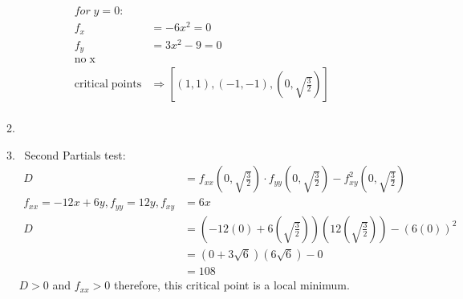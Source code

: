 \documentclass[11pt]{article}
\newcommand\Item[1][]{%
  \ifx\relax#1\relax  \item \else \item[#1] \fi
  \abovedisplayskip=0pt\abovedisplayshortskip=0pt~\vspace*{-\baselineskip}}
\begin{document}
\begin{preview}
\begin{enumerate}
\begin{enumerate}
\begin{align*}
                  for \; y=0:                                                                             \\
                  f_x                              & = -6x^2 = 0                                          \\
                  f_y                              & = 3x^2 - 9 = 0                                       \\
                  \mathrm{no \; x}                                                                        \\
                  \mathrm{critical \; points}      & \Rightarrow [(1,1), (-1,-1), (0,\sqrt{\frac{3}{2}})] \\
              \end{align*}
              \Item Second Partials test:
              \begin{align*}
                  D                                        & = f_{xx}(0,\sqrt{\frac{3}{2}}) \cdot f_{yy}(0,\sqrt{\frac{3}{2}}) - f^2_{xy}(0,\sqrt{\frac{3}{2}}) \\
                  f_{xx} = -12x + 6y, f_{yy} = 12y, f_{xy} & = 6x                                                                                               \\
                  D                                        & = (-12(0) + 6\left(\sqrt{\frac{3}{2}}\right))(12\left(\sqrt{\frac{3}{2}}\right)) - (6(0))^2        \\
                                                           & = (0 + 3\sqrt{6})(6\sqrt{6})-0                                                                     \\
                                                           & =    108
              \end{align*}
              $D>0$ and $f_{xx} > 0$ therefore, this critical point is a local minimum.
          \end{enumerate}


\end{enumerate}
\end{preview}
\end{document}
